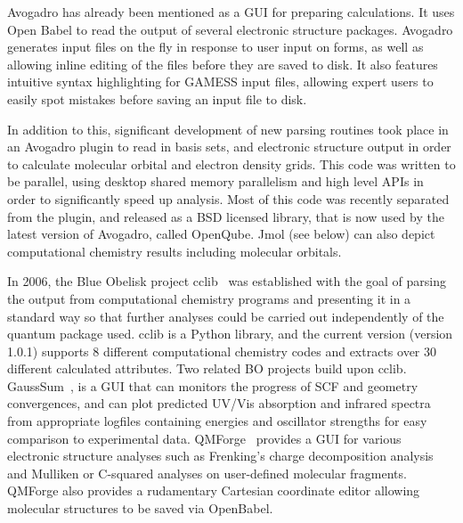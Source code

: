 \documentclass[10pt]{bmc_article}
\newenvironment{bmcformat}{\fussy\setboolean{publ}{true}}{\fussy}
\begin{document}
\begin{bmcformat}
Avogadro has already been mentioned as a GUI for preparing calculations.
It uses Open Babel to read the output of several electronic structure
packages. Avogadro generates input files on the fly in response to user
input on forms, as well as allowing inline editing of the files before
they are saved to disk. It also features intuitive syntax highlighting
for GAMESS input files, allowing expert users to easily spot mistakes
before saving an input file to disk.

In addition to this, significant development of new parsing routines took
place in an Avogadro plugin to read in basis sets, and electronic structure
output in order to calculate molecular orbital and electron density grids.
This code was written to be parallel, using desktop shared memory parallelism
and high level APIs in order to significantly speed up analysis. Most of this
code was recently separated from the plugin, and released as a BSD licensed
library, that is now used by the latest version of Avogadro, called OpenQube.
Jmol (see below)
can also depict computational chemistry results including molecular orbitals.

In 2006, the Blue Obelisk project cclib~\cite{cclib} was established
with the goal of parsing the output from computational chemistry
programs and presenting it in a standard way so that further analyses
could be carried out independently of the quantum package used.
cclib is a Python library, and the current version (version 1.0.1)
supports 8 different computational chemistry codes and extracts over
30 different calculated attributes. Two related BO projects build upon 
cclib. GaussSum~\cite{WebGaussSum},
is a GUI that can monitors the progress of SCF and geometry convergences, 
and can plot predicted UV/Vis absorption and infrared spectra from 
appropriate logfiles containing energies and oscillator strengths for easy 
comparison to experimental data. QMForge~\cite{WebQMForge} provides 
a GUI for various electronic structure analyses such as Frenking's charge 
decomposition analysis~\cite{Frenking} and Mulliken or C-squared analyses
on user-defined molecular fragments. QMForge also provides a rudamentary
Cartesian coordinate editor allowing molecular structures to be saved via OpenBabel.


\end{bmcformat}
\end{document}
